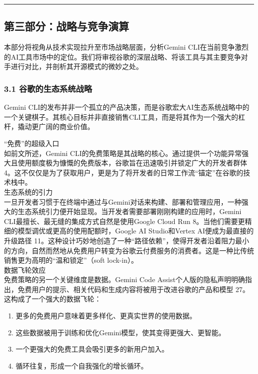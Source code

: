 \documentclass[a4paper,12pt]{article}
\providecommand{\tightlist}{%
  \setlength{\itemsep}{0pt}\setlength{\parskip}{0pt}}
\begin{document}
\begin{multicols}{2}
    \begin{center}\rule{0.5\linewidth}{0.5pt}\end{center}

    \subsection{\texorpdfstring{\textbf{第三部分：战略与竞争演算}}{第三部分：战略与竞争演算}}\label{ux7b2cux4e09ux90e8ux5206ux6218ux7565ux4e0eux7adeux4e89ux6f14ux7b97}

    本部分将视角从技术实现拉升至市场战略层面，分析Gemini
    CLI在当前竞争激烈的AI工具市场中的定位。我们将审视谷歌的深层战略、将该工具与其主要竞争对手进行对比，并剖析其开源模式的微妙之处。

    \subsubsection{\texorpdfstring{\textbf{3.1
    谷歌的生态系统战略}}{3.1 谷歌的生态系统战略}}\label{ux8c37ux6b4cux7684ux751fux6001ux7cfbux7edfux6218ux7565}

    Gemini
    CLI的发布并非一个孤立的产品决策，而是谷歌宏大AI生态系统战略中的一个关键棋子。其核心目标并非直接销售CLI工具，而是将其作为一个强大的杠杆，撬动更广阔的商业价值。

    ``免费''的超级入口\\
    如前文所述，Gemini
    CLI的免费策略是其战略的核心。通过提供一个功能异常强大且使用额度极为慷慨的免费版本，谷歌旨在迅速吸引并锁定广大的开发者群体
    4。这不仅仅是为了获取用户，更是为了将开发者的日常工作流``锚定''在谷歌的技术栈中。\\
    生态系统的引力\\
    一旦开发者习惯于在终端中通过与Gemini对话来构建、部署和管理应用，一种强大的生态系统引力便开始显现。当开发者需要部署刚刚构建的应用时，Gemini
    CLI最擅长、最无缝的集成方式自然是使用Google Cloud Run
    8。当他们需要更精细的模型调优或更高的使用配额时，Google AI
    Studio和Vertex AI便成为最直接的升级路径
    11。这种设计巧妙地创造了一种``路径依赖''，使得开发者沿着阻力最小的方向，自然而然地从免费用户转变为谷歌云付费服务的消费者。这是一种比传统销售更为高明的``温和锁定''（soft
    lock-in）。\\
    数据飞轮效应\\
    免费策略的另一个关键维度是数据。Gemini Code
    Assist个人版的隐私声明明确指出，免费用户的提示、相关代码和生成内容将被用于改进谷歌的产品和模型
    27。这构成了一个强大的数据飞轮：

    \begin{enumerate}
    \def\labelenumi{\arabic{enumi}.}
    \tightlist
    \item
      更多的免费用户意味着更多样化、更真实世界的使用数据。\\
    \item
      这些数据被用于训练和优化Gemini模型，使其变得更强大、更智能。\\
    \item
      一个更强大的免费工具会吸引更多的新用户加入。\\
    \item
      循环往复，形成一个自我强化的增长循环。
    \end{enumerate}


\end{multicols}
\end{document}
